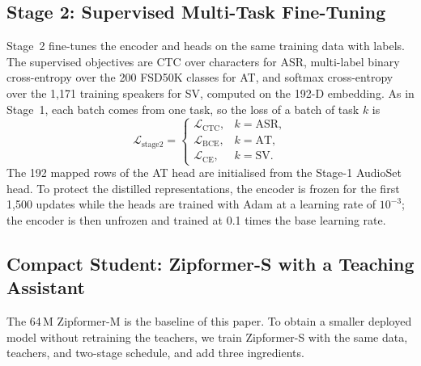 \documentclass[lettersize,journal]{IEEEtran}
\begin{document}
\subsection{Stage 2: Supervised Multi-Task Fine-Tuning}
Stage~2 fine-tunes the encoder and heads on the same training data with labels. The supervised objectives are CTC
over characters for ASR, multi-label binary cross-entropy over the 200 FSD50K classes for AT, and softmax
cross-entropy over the 1,171 training speakers for SV, computed on the 192-D embedding. As in Stage~1, each batch
comes from one task, so the loss of a batch of task $k$ is
\begin{equation}
  \mathcal{L}_{\text{stage2}} =
  \begin{cases}
    \mathcal{L}_{\text{CTC}}, & k=\text{ASR},\\
    \mathcal{L}_{\text{BCE}}, & k=\text{AT},\\
    \mathcal{L}_{\text{CE}},  & k=\text{SV}.
  \end{cases}
  \label{eq:stage2}
\end{equation}
The 192 mapped rows of the AT head are initialised from the Stage-1 AudioSet head. To protect the distilled
representations, the encoder is frozen for the first 1,500 updates while the heads are trained with Adam at a
learning rate of $10^{-3}$; the encoder is then unfrozen and trained at 0.1 times the base learning rate.

\subsection{Compact Student: Zipformer-S with a Teaching Assistant}\label{sec:zips}
The 64\,M Zipformer-M is the baseline of this paper. To obtain a smaller deployed model without retraining the
teachers, we train Zipformer-S with the same data, teachers, and two-stage schedule, and add three ingredients.
\end{document}
